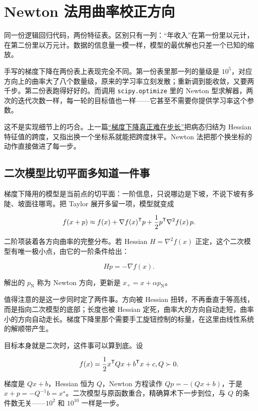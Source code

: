 \section{Newton 法用曲率校正方向}
\label{sec:09-Convex-Optimization/06-Optimization-Algorithms/02}

同一份逻辑回归代码，两份特征表。区别只有一列：``年收入''在第一份里以元计，在第二份里以万元计。数据的信息量一模一样，模型的最优解也只差一个已知的缩放。

手写的梯度下降在两份表上表现完全不同。第一份表里那一列的量级是 \(10^5\)，对应方向上的曲率大了八个数量级，原来的学习率立刻发散；重新调到能收敛，又要两千步。第二份表跑得好好的。而调用 \texttt{scipy.optimize} 里的 Newton 型求解器，两次的迭代次数一样，每一轮的目标值也一样——它甚至不需要你提供学习率这个参数。

这不是实现细节上的巧合。上一篇\hyperref[sec:09-Convex-Optimization/06-Optimization-Algorithms/01]{``梯度下降真正难在步长''}把病态归结为 Hessian 特征值的跨度，又指出换一个坐标系就能把跨度抹平。Newton 法把那个换坐标的动作直接做进了每一步。

\subsection{二次模型比切平面多知道一件事}

梯度下降用的模型是当前点的切平面：一阶信息，只说哪边是下坡，不说下坡有多陡、坡面往哪弯。把 Taylor 展开多留一项，模型就变成

\[
f(x+p)\approx f(x)+\nabla f(x)^{\mathsf{T}}p+\frac{1}{2}p^{\mathsf{T}}\nabla^2f(x)\,p .
\]

二阶项装着各方向曲率的完整分布。若 Hessian \(H=\nabla^2f(x)\) 正定，这个二次模型有唯一极小点，由它的一阶条件给出：

\[
H p=-\nabla f(x).
\]

解出的 \(p_{\mathrm N}\) 称为 Newton 方向，更新是 \(x_+=x+\alpha p_{\mathrm N}\)。

值得注意的是这一步同时定了两件事。方向被 Hessian 扭转，不再垂直于等高线，而是指向二次模型的底部；长度也被 Hessian 定死，曲率大的方向自动走短，曲率小的方向自动走长。梯度下降里那个需要手工旋钮控制的标量，在这里由线性系统的解顺带产生。

目标本身就是二次时，这件事可以算到底。设

\[
f(x)=\frac{1}{2}x^{\mathsf{T}}Qx+b^{\mathsf{T}}x+c,\space Q\succ0 .
\]

梯度是 \(Qx+b\)，Hessian 恒为 \(Q\)，Newton 方程读作 \(Qp=-(Qx+b)\)，于是 \(x+p=-Q^{-1}b=x^\star\)。二次模型与原函数重合，精确算术下一步到位，与 \(Q\) 的条件数无关——\(10^2\) 和 \(10^{10}\) 一样是一步。

